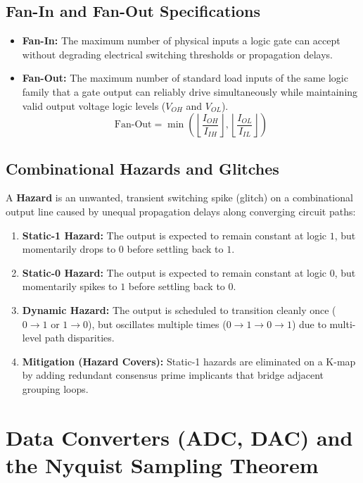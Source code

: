 \subsection{Fan-In and Fan-Out Specifications}
\begin{itemize}
    \item \textbf{Fan-In:} The maximum number of physical inputs a logic gate can accept without degrading electrical switching thresholds or propagation delays.
    \item \textbf{Fan-Out:} The maximum number of standard load inputs of the same logic family that a gate output can reliably drive simultaneously while maintaining valid output voltage logic levels ($V_{OH}$ and $V_{OL}$).
    \begin{equation}
    \label{eq:fan_out}
    \text{Fan-Out} = \min \left( \left\lfloor \frac{I_{OH}}{I_{IH}} \right\rfloor, \left\lfloor \frac{I_{OL}}{I_{IL}} \right\rfloor \right)
    \end{equation}
\end{itemize}

\subsection{Combinational Hazards and Glitches}
A \textbf{Hazard} is an unwanted, transient switching spike (glitch) on a combinational output line caused by unequal propagation delays along converging circuit paths:
\begin{enumerate}[label=\bfseries\arabic*.]
    \item \textbf{Static-1 Hazard:} The output is expected to remain constant at logic $1$, but momentarily drops to $0$ before settling back to $1$.
    \item \textbf{Static-0 Hazard:} The output is expected to remain constant at logic $0$, but momentarily spikes to $1$ before settling back to $0$.
    \item \textbf{Dynamic Hazard:} The output is scheduled to transition cleanly once ($0 \to 1$ or $1 \to 0$), but oscillates multiple times ($0 \to 1 \to 0 \to 1$) due to multi-level path disparities.
    \item \textbf{Mitigation (Hazard Covers):} Static-1 hazards are eliminated on a K-map by adding redundant consensus prime implicants that bridge adjacent grouping loops.
\end{enumerate}


\section{Data Converters (ADC, DAC) and the Nyquist Sampling Theorem}
\label{sec:data_converters}

